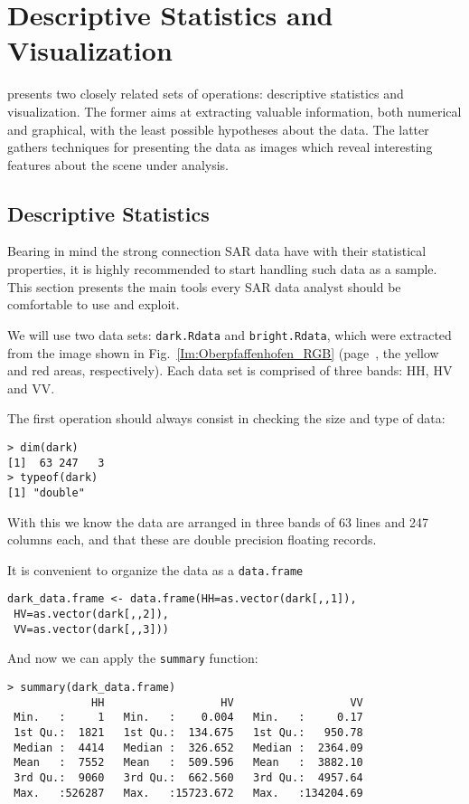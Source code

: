 \chapter{Descriptive Statistics and Visualization}\label{Chapter:DescriptiveVisualization}

 presents two closely related sets of operations:
descriptive statistics and visualization.
The former aims at extracting valuable information, both numerical and graphical, with the least possible hypotheses about the data.
The latter gathers techniques for presenting the data as images which reveal interesting features about the scene under analysis.

\section{Descriptive Statistics}

Bearing in mind the strong connection SAR data have with their statistical properties, it is highly recommended to start handling such data as a sample. This section presents the main tools every SAR data analyst should be comfortable to use and exploit.

We will use two data sets: \texttt{dark.Rdata} and \texttt{bright.Rdata}, which were extracted from the image shown in Fig.~\ref{Im:Oberpfaffenhofen_RGB} (page~\pageref{Im:Oberpfaffenhofen_RGB}, the yellow and red areas, respectively).
Each data set is comprised of three bands: HH, HV and VV.

The first operation should always consist in checking the size and type of data:
\begin{lstlisting}
> dim(dark)
[1]  63 247   3
> typeof(dark)
[1] "double"
\end{lstlisting}
With this we know the data are arranged in three bands of \num{63} lines and \num{247} columns each, and that these are double precision floating records.

It is convenient to organize the data as a \texttt{data.frame}
\begin{lstlisting}
dark_data.frame <- data.frame(HH=as.vector(dark[,,1]),
 HV=as.vector(dark[,,2]), 
 VV=as.vector(dark[,,3]))
\end{lstlisting}

And now we can apply the \texttt{summary} function:
\begin{lstlisting}[caption={Summary statistics},label=Code:SummaryStatistics]
> summary(dark_data.frame)
             HH                  HV                  VV
 Min.   :     1   Min.   :    0.004   Min.   :     0.17  
 1st Qu.:  1821   1st Qu.:  134.675   1st Qu.:   950.78  
 Median :  4414   Median :  326.652   Median :  2364.09  
 Mean   :  7552   Mean   :  509.596   Mean   :  3882.10  
 3rd Qu.:  9060   3rd Qu.:  662.560   3rd Qu.:  4957.64  
 Max.   :526287   Max.   :15723.672   Max.   :134204.69  
\end{lstlisting}

